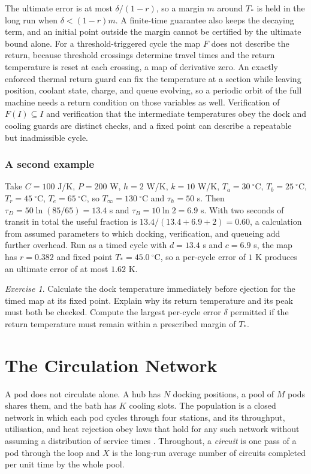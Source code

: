 \documentclass[11pt,openany]{book}
\theoremstyle{plain}
\theoremstyle{definition}
\theoremstyle{remark}
\newtheorem{exercise}[theorem]{Exercise}
\begin{document}
The ultimate error is at most $\delta/(1-r)$, so a margin $m$ around $T_*$ is held in the long run when $\delta<(1-r)m$. A finite-time guarantee also keeps the decaying term, and an initial point outside the margin cannot be certified by the ultimate bound alone. For a threshold-triggered cycle the map $F$ does not describe the return, because threshold crossings determine travel times and the return temperature is reset at each crossing, a map of derivative zero. An exactly enforced thermal return guard can fix the temperature at a section while leaving position, coolant state, charge, and queue evolving, so a periodic orbit of the full machine needs a return condition on those variables as well. Verification of $F(I)\subseteq I$ and verification that the intermediate temperatures obey the dock and cooling guards are distinct checks, and a fixed point can describe a repeatable but inadmissible cycle.

\subsection*{A second example}

Take $C=100$ J/K, $P=200$ W, $h=2$ W/K, $k=10$ W/K, $T_a=30\ ^\circ$C, $T_b=25\ ^\circ$C, $T_r=45\ ^\circ$C, $T_e=65\ ^\circ$C, so $T_\infty=130\ ^\circ$C and $\tau_h=50$ s. Then $\tau_D=50\ln(85/65)=13.4$ s and $\tau_B=10\ln2=6.9$ s. With two seconds of transit in total the useful fraction is $13.4/(13.4+6.9+2)=0.60$, a calculation from assumed parameters to which docking, verification, and queueing add further overhead. Run as a timed cycle with $d=13.4$ s and $c=6.9$ s, the map has $r=0.382$ and fixed point $T_*=45.0\ ^\circ$C, so a per-cycle error of $1$ K produces an ultimate error of at most $1.62$ K.

\begin{exercise}
Calculate the dock temperature immediately before ejection for the timed map at its fixed point. Explain why its return temperature and its peak must both be checked. Compute the largest per-cycle error $\delta$ permitted if the return temperature must remain within a prescribed margin of $T_*$.
\end{exercise}

\chapter{The Circulation Network}
\label{ch:circulation}

A pod does not circulate alone. A hub has $N$ docking positions, a pool of $M$ pods shares them, and the bath has $K$ cooling slots. The population is a closed network in which each pod cycles through four stations, and its throughput, utilisation, and heat rejection obey laws that hold for any such network without assuming a distribution of service times \cite{denning}. Throughout, a \emph{circuit} is one pass of a pod through the loop and $X$ is the long-run average number of circuits completed per unit time by the whole pool.
\end{document}
